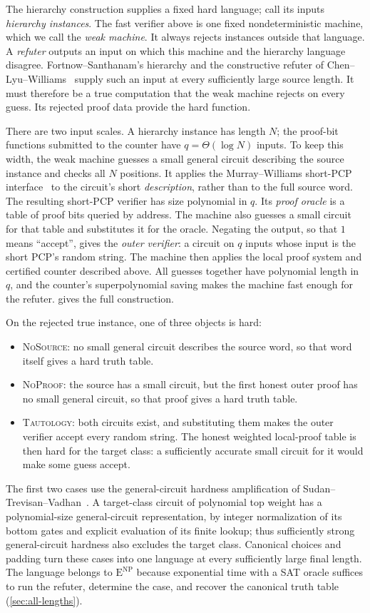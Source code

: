 \documentclass[11pt,letterpaper]{article}
\theoremstyle{definition}
\theoremstyle{remark}
\newcommand{\ENP}{\mathrm{E}^{\mathrm{NP}}}
\begin{document}
The hierarchy construction supplies a fixed hard language; call its
inputs \emph{hierarchy instances}. The fast verifier above is one
fixed nondeterministic machine, which we call the \emph{weak machine}.
It always rejects instances outside that language.
A \emph{refuter} outputs an input on which this machine and the
hierarchy language disagree. Fortnow--Santhanam's hierarchy and the
constructive refuter of Chen--Lyu--Williams~\cite{FS16,CLW20} supply
such an input at every sufficiently large source length. It must therefore
be a true computation that the weak machine rejects on every guess.
Its rejected proof data provide the hard function.

There are two input scales. A hierarchy instance has length \(N\);
the proof-bit functions submitted to the counter have
\(q=\Theta(\log N)\) inputs. To keep this width, the weak machine
guesses a small general circuit describing the source instance and
checks all \(N\) positions. It applies the Murray--Williams
short-PCP interface~\cite{MW20} to the circuit's short
\emph{description}, rather than to the full source word. The
resulting short-PCP verifier has size polynomial in \(q\). Its
\emph{proof oracle} is a table of proof bits queried by address.
The machine also guesses a small circuit for that table and
substitutes it for the oracle. Negating the output, so that \(1\) means
``accept'', gives the \emph{outer verifier}: a circuit on \(q\) inputs
whose input is the short PCP's random string.
The machine then applies the local
proof system and certified counter described above. All guesses
together have polynomial length in \(q\), and the counter's
superpolynomial saving makes the machine fast enough for the refuter.
 gives the full construction.

On the rejected true instance, one of three objects is hard:
\begin{itemize}
\item \textsc{NoSource}: no small general circuit describes the
source word, so that word itself gives a hard truth table.
\item \textsc{NoProof}: the source has a small circuit, but the
first honest outer proof has no small general circuit, so that
proof gives a hard truth table.
\item \textsc{Tautology}: both circuits exist, and substituting them
makes the outer verifier accept every random string. The honest weighted
local-proof table is then hard for the target class: a sufficiently
accurate small circuit for it would make some guess accept.
\end{itemize}
The first two cases use the general-circuit hardness amplification
of Sudan--Trevisan--Vadhan~\cite{STV01}. A target-class circuit of
polynomial top weight has a polynomial-size general-circuit
representation, by integer normalization of its bottom gates and
explicit evaluation of its finite lookup; thus sufficiently strong
general-circuit hardness also excludes the target class.
Canonical choices and padding
turn these cases into one language at every sufficiently large final
length. The language belongs to \(\ENP\) because exponential time
with a SAT oracle suffices to run the refuter, determine the case,
and recover the canonical truth table (\cref{sec:all-lengths}).
\end{document}
